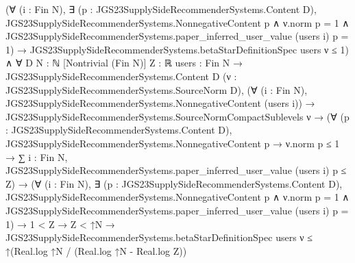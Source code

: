 \documentclass[10pt]{article}
\begin{document}
\begin{ReviewVerbatim}
            (∀ (i : Fin N),
                ∃ (p : JGS23SupplySideRecommenderSystems.Content D),
                  JGS23SupplySideRecommenderSystems.NonnegativeContent p ∧
                    ν.norm p = 1 ∧ JGS23SupplySideRecommenderSystems.paper_inferred_user_value (users i) p = 1) →
              JGS23SupplySideRecommenderSystems.betaStarDefinitionSpec users ν ≤ 1) ∧
    ∀ {D N : ℕ} [Nontrivial (Fin N)] {Z : ℝ} {users : Fin N → JGS23SupplySideRecommenderSystems.Content D}
      (ν : JGS23SupplySideRecommenderSystems.SourceNorm D),
      (∀ (i : Fin N), JGS23SupplySideRecommenderSystems.NonnegativeContent (users i)) →
        JGS23SupplySideRecommenderSystems.SourceNormCompactSublevels ν →
          (∀ (p : JGS23SupplySideRecommenderSystems.Content D),
              JGS23SupplySideRecommenderSystems.NonnegativeContent p →
                ν.norm p ≤ 1 →
                  ∑ i : Fin N, JGS23SupplySideRecommenderSystems.paper_inferred_user_value (users i) p ≤ Z) →
            (∀ (i : Fin N),
                ∃ (p : JGS23SupplySideRecommenderSystems.Content D),
                  JGS23SupplySideRecommenderSystems.NonnegativeContent p ∧
                    ν.norm p = 1 ∧ JGS23SupplySideRecommenderSystems.paper_inferred_user_value (users i) p = 1) →
              1 < Z →
                Z < ↑N →
                  JGS23SupplySideRecommenderSystems.betaStarDefinitionSpec users ν ≤
                    ↑(Real.log ↑N / (Real.log ↑N - Real.log Z))
\end{ReviewVerbatim}
\end{document}
